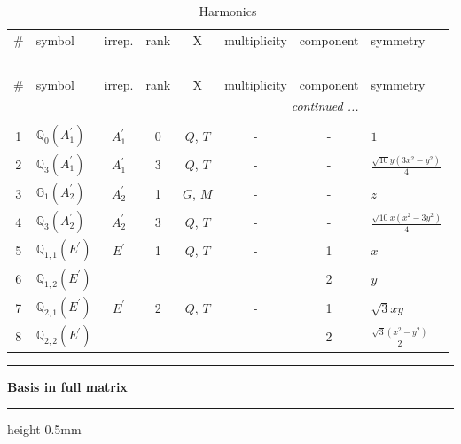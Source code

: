 \documentclass[fleqn,10pt,landscape]{jsarticle}
\begin{document}
\renewcommand{\arraystretch}{1.6}
\begin{longtable}[l]{clcccccl}
\captionsetup{justification=raggedright, singlelinecheck=off}
\caption{Harmonics}
 \\
 \hline \hline
\# & symbol & irrep. & rank & X & multiplicity & component & symmetry \\ \hline \endfirsthead

\multicolumn{7}{l}{\tablename\ \thetable{}} \\
 \hline \hline
\# & symbol & irrep. & rank & X & multiplicity & component & symmetry \\ \hline \endhead

 \hline \hline
\multicolumn{7}{r}{\footnotesize\it continued ...} \\ \endfoot

 \hline \hline
\multicolumn{7}{r}{} \\ \endlastfoot

1 & $\mathbb{Q}_{0}(A_{1}^{\prime})$ & $A_{1}^{\prime}$ & 0 & $Q$, $T$ & - & - & $1$ \\ \hline
2 & $\mathbb{Q}_{3}(A_{1}^{\prime})$ & $A_{1}^{\prime}$ & 3 & $Q$, $T$ & - & - & $\frac{\sqrt{10} y \left(3 x^{2} - y^{2}\right)}{4}$ \\ \hline
3 & $\mathbb{G}_{1}(A_{2}^{\prime})$ & $A_{2}^{\prime}$ & 1 & $G$, $M$ & - & - & $z$ \\ \hline
4 & $\mathbb{Q}_{3}(A_{2}^{\prime})$ & $A_{2}^{\prime}$ & 3 & $Q$, $T$ & - & - & $\frac{\sqrt{10} x \left(x^{2} - 3 y^{2}\right)}{4}$ \\ \hline
5 & $\mathbb{Q}_{1,1}(E^{\prime})$ & $E^{\prime}$ & 1 & $Q$, $T$ & - & 1 & $x$ \\
6 & $\mathbb{Q}_{1,2}(E^{\prime})$ &  &  &  &  & 2 & $y$ \\ \hline
7 & $\mathbb{Q}_{2,1}(E^{\prime})$ & $E^{\prime}$ & 2 & $Q$, $T$ & - & 1 & $\sqrt{3} x y$ \\
8 & $\mathbb{Q}_{2,2}(E^{\prime})$ &  &  &  &  & 2 & $\frac{\sqrt{3} \left(x^{2} - y^{2}\right)}{2}$ \\
\end{longtable}
\vspace{5mm}
\noindent \rule[0.5mm]{5mm}{0.5mm}\hspace{3mm}\textbf{Basis in full matrix}\hspace{3mm}\leaders\hrule height 0.5mm\hfill\kern0pt
\vspace{3mm}
\end{document}
